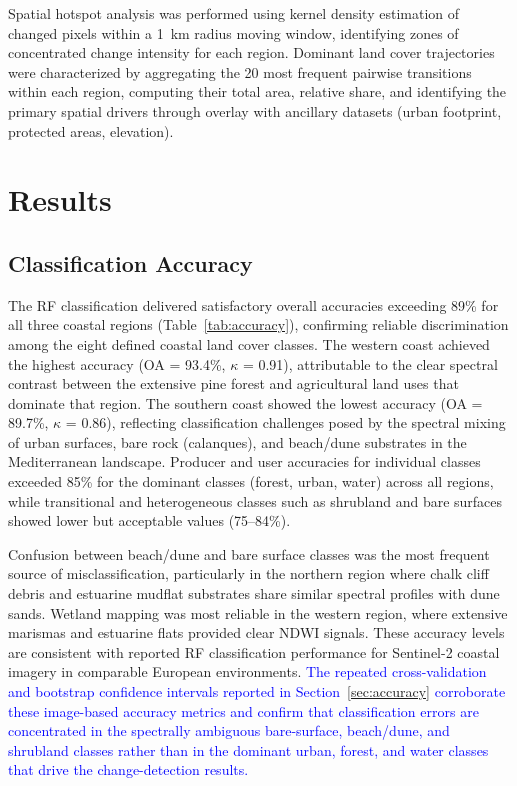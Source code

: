 \documentclass[coasts,article,submit,pdftex,moreauthors]{Definitions/mdpi}
\begin{document}
Spatial hotspot analysis was performed using kernel density estimation of changed pixels within a 1~km radius moving window, identifying zones of concentrated change intensity for each region. Dominant land cover trajectories were characterized by aggregating the 20 most frequent pairwise transitions within each region, computing their total area, relative share, and identifying the primary spatial drivers through overlay with ancillary datasets (urban footprint, protected areas, elevation).

\section{Results}

\subsection{Classification Accuracy}

The RF classification delivered satisfactory overall accuracies exceeding 89\% for all three coastal regions (Table~\ref{tab:accuracy}), confirming reliable discrimination among the eight defined coastal land cover classes. The western coast achieved the highest accuracy (OA = 93.4\%, $\kappa$ = 0.91), attributable to the clear spectral contrast between the extensive pine forest and agricultural land uses that dominate that region. The southern coast showed the lowest accuracy (OA = 89.7\%, $\kappa$ = 0.86), reflecting classification challenges posed by the spectral mixing of urban surfaces, bare rock (calanques), and beach/dune substrates in the Mediterranean landscape. Producer and user accuracies for individual classes exceeded 85\% for the dominant classes (forest, urban, water) across all regions, while transitional and heterogeneous classes such as shrubland and bare surfaces showed lower but acceptable values (75--84\%).

Confusion between beach/dune and bare surface classes was the most frequent source of misclassification, particularly in the northern region where chalk cliff debris and estuarine mudflat substrates share similar spectral profiles with dune sands. Wetland mapping was most reliable in the western region, where extensive marismas and estuarine flats provided clear NDWI signals. These accuracy levels are consistent with reported RF classification performance for Sentinel-2 coastal imagery in comparable European environments. \textcolor{blue}{The repeated cross-validation and bootstrap confidence intervals reported in Section~\ref{sec:accuracy} corroborate these image-based accuracy metrics and confirm that classification errors are concentrated in the spectrally ambiguous bare-surface, beach/dune, and shrubland classes rather than in the dominant urban, forest, and water classes that drive the change-detection results.}
\end{document}
